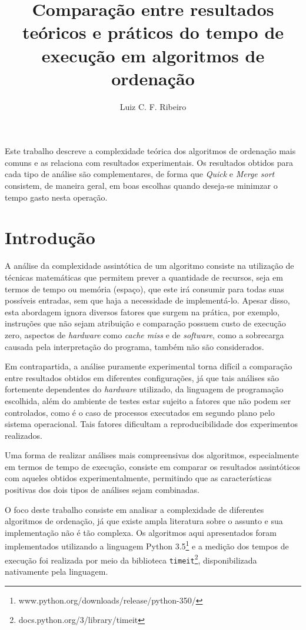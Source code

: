 \documentclass[12pt]{article}
\title{Comparação entre resultados teóricos e práticos do tempo de execução em algoritmos de ordenação}
\author{Luiz C. F. Ribeiro}
\begin{document}
 

\maketitle

\begin{resumo}
Este trabalho descreve a complexidade teórica dos algoritmos de ordenação mais comuns e as relaciona com resultados experimentais. Os resultados obtidos para cada tipo de análise são complementares, de forma que \textit{Quick} e \textit{Merge sort} consistem, de maneira geral, em boas escolhas quando deseja-se minimzar o tempo gasto nesta operação.
\end{resumo}


\section{Introdução}

A análise da complexidade assintótica de um algoritmo consiste na utilização de técnicas matemáticas que permitem prever a quantidade de recursos, seja em termos de tempo ou memória (espaço), que este irá consumir para todas suas possíveis entradas, sem que haja a necessidade de implementá-lo. Apesar disso, esta abordagem ignora diversos fatores que surgem na prática, por exemplo, instruções que não sejam atribuição e comparação possuem custo de execução zero, aspectos de \textit{hardware} como \textit{cache miss} e de \textit{software}, como a sobrecarga causada pela interpretação do programa, também não são considerados.

Em contrapartida, a análise puramente experimental torna difícil a comparação entre resultados obtidos em diferentes configurações, já que tais análises são fortemente dependentes do \textit{hardware} utilizado, da linguagem de programação escolhida, além do ambiente de testes estar sujeito a fatores que não podem ser controlados, como é o caso de processos executados em segundo plano pelo sistema operacional. Tais fatores dificultam a reproducibilidade dos experimentos realizados.

Uma forma de realizar análises mais compreensivas dos algoritmos, especialmente em termos de tempo de execução, consiste em comparar os resultados assintóticos com aqueles obtidos experimentalmente, permitindo que as características positivas dos dois tipos de análises sejam combinadas.

O foco deste trabalho consiste em analisar a complexidade de diferentes algoritmos de ordenação, já que existe ampla literatura sobre o assunto e sua implementação não é tão complexa. Os algoritmos aqui apresentados foram implementados utilizando a linguagem Python 3.5\footnote{www.python.org/downloads/release/python-350/} e a medição dos tempos de execução foi realizada por meio da biblioteca \texttt{timeit}\footnote{docs.python.org/3/library/timeit}, disponibilizada nativamente pela linguagem.
\end{document}
